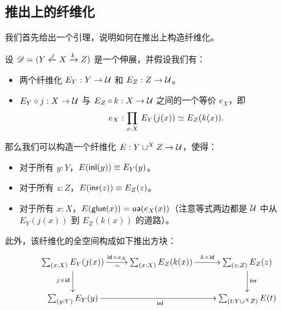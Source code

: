 \subsection{推出上的纤维化}
\label{sec:fib-over-pushout}

我们首先给出一个引理，说明如何在推出上构造纤维化。
%

\begin{lem}\label{lem:fibration-over-pushout}
  设 $\mathscr{D}=(Y\xleftarrow{j}X\xrightarrow{k}Z)$ 是一个伸展，并假设我们有：
  \begin{itemize}
  \item 两个纤维化 $E_Y:Y\to\mathcal{U}$ 和 $E_Z:Z\to\mathcal{U}$。
  \item $E_Y\circ j:X\to\mathcal{U}$ 与 $E_Z\circ k:X\to\mathcal{U}$ 之间的一个等价 $e_X$，即
    \[e_X:\prd{x:X}\eqv{E_Y(j(x))}{E_Z(k(x))}.\]
  \end{itemize}

  那么我们可以构造一个纤维化 $E:Y\sqcup^XZ\to\mathcal{U}$，使得：
  \begin{itemize}
  \item 对于所有 $y:Y$，$E({\mathsf{inl}}(y))\equiv E_Y(y)$。
  \item 对于所有 $z:Z$，$E({\mathsf{inr}}(z))\equiv E_Z(z)$。
  \item 对于所有 $x:X$，${E}\mathopen{}\left({\mathsf{glue}(x)}\right)\mathclose{}=\mathsf{ua}(e_X(x))$（注意等式两边都是 $\mathcal{U}$ 中从 $E_Y(j(x))$ 到 $E_Z(k(x))$ 的道路）。
  \end{itemize}
  此外，该纤维化的全空间构成如下推出方块：
  \[\xymatrix{ \sm{x:X}E_Y(j(x)) \ar[r]_\sim^{\idfunc\times e_X}
    \ar[d]_{j\times\idfunc} &
    \sm{x:X}E_Z(k(x)) \ar[r]^-{k\times\idfunc}
    & \sm{z:Z}E_Z(z) \ar[d]^{\inr} \\
    \sm{y:Y}E_Y(y) \ar[rr]_{\inl} & & \sm{t:Y\sqcup^XZ}E(t) }\]
\end{lem}

